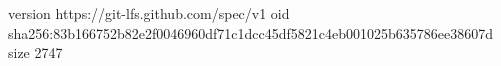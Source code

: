 version https://git-lfs.github.com/spec/v1
oid sha256:83b166752b82e2f0046960df71c1dcc45df5821c4eb001025b635786ee38607d
size 2747

